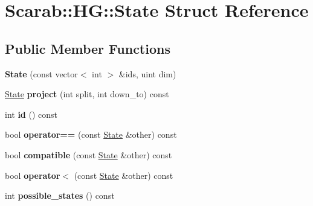 \hypertarget{struct_scarab_1_1_h_g_1_1_state}{
\section{Scarab::HG::State Struct Reference}
\label{struct_scarab_1_1_h_g_1_1_state}
}
\subsection*{Public Member Functions}
\begin{DoxyCompactItemize}
\item 
\hypertarget{struct_scarab_1_1_h_g_1_1_state_a61592030e999341da1e674274db11307}{
{\bfseries State} (const vector$<$ int $>$ \&ids, uint dim)}
\label{struct_scarab_1_1_h_g_1_1_state_a61592030e999341da1e674274db11307}

\item 
\hypertarget{struct_scarab_1_1_h_g_1_1_state_a6597ae0951c6d0c9146ae6bd5b91b52f}{
\hyperlink{struct_scarab_1_1_h_g_1_1_state}{State} {\bfseries project} (int split, int down\_\-to) const }
\label{struct_scarab_1_1_h_g_1_1_state_a6597ae0951c6d0c9146ae6bd5b91b52f}

\item 
\hypertarget{struct_scarab_1_1_h_g_1_1_state_ac7f5641edb1dd813dcac3b76be28d305}{
int {\bfseries id} () const }
\label{struct_scarab_1_1_h_g_1_1_state_ac7f5641edb1dd813dcac3b76be28d305}

\item 
\hypertarget{struct_scarab_1_1_h_g_1_1_state_a17d205eca9f3be9c01c7d41e3fe4d809}{
bool {\bfseries operator==} (const \hyperlink{struct_scarab_1_1_h_g_1_1_state}{State} \&other) const }
\label{struct_scarab_1_1_h_g_1_1_state_a17d205eca9f3be9c01c7d41e3fe4d809}

\item 
\hypertarget{struct_scarab_1_1_h_g_1_1_state_acd8ef3e5bd73ec5034de0d70f2bb2492}{
bool {\bfseries compatible} (const \hyperlink{struct_scarab_1_1_h_g_1_1_state}{State} \&other) const }
\label{struct_scarab_1_1_h_g_1_1_state_acd8ef3e5bd73ec5034de0d70f2bb2492}

\item 
\hypertarget{struct_scarab_1_1_h_g_1_1_state_abadb936b551a91d952af74b3bfc7d43d}{
bool {\bfseries operator$<$} (const \hyperlink{struct_scarab_1_1_h_g_1_1_state}{State} \&other) const }
\label{struct_scarab_1_1_h_g_1_1_state_abadb936b551a91d952af74b3bfc7d43d}

\item 
\hypertarget{struct_scarab_1_1_h_g_1_1_state_afc65eeacc345b5396a673e4328cccc11}{
int {\bfseries possible\_\-states} () const }
\label{struct_scarab_1_1_h_g_1_1_state_afc65eeacc345b5396a673e4328cccc11}

\end{DoxyCompactItemize}
